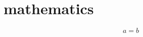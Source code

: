 \documentclass[11pt,a4j,report]{jsarticle}
\begin{document}
\section{mathematics}

\begin{equation}
a = b
\end{equation}
\end{document}
